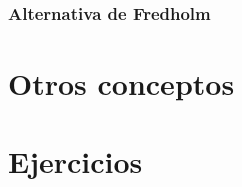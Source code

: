\documentclass[palatino]{apuntes}
\begin{document}
\subsection{Alternativa de Fredholm}

\appendix

\chapter{Otros conceptos}


\chapter{Ejercicios}


\nocite{brezis2010functional,reed1980methods,rudin1991functional,ApuntesVarReal}
{}

\printindex
\end{document}

